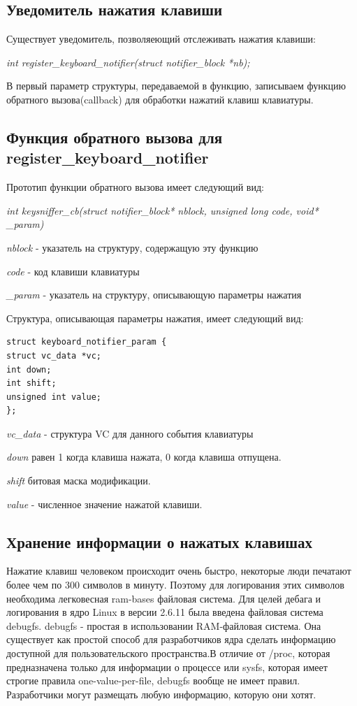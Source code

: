 \subsection{Уведомитель нажатия клавиши}
Существует уведомитель, позволяеющий отслеживать нажатия клавиши:

\textit{int register\_keyboard\_notifier(struct notifier\_block *nb);}

В первый параметр  структуры, передаваемой в функцию,  записываем функцию обратного вызова(callback) для обработки нажатий клавиш клавиатуры.


\subsection{Функция обратного вызова для register\_keyboard\_notifier}
Прототип функции обратного вызова имеет следующий вид:

\textit{int keysniffer\_cb(struct notifier\_block* nblock,
unsigned long code,
void* \_param)
}

\textit{nblock} - указатель на структуру, содержащую эту функцию

\textit{code} - код клавиши клавиатуры

\textit{\_param} - указатель на структуру, описывающую параметры нажатия

Структура, описывающая параметры нажатия, имеет следующий вид:
 \begin{lstlisting}[style=pseudocode,caption={ struct keyboard\_notifier\_param}] 
struct keyboard_notifier_param {
struct vc_data *vc;	
int down;	
int shift;	
unsigned int value;	
};
 \end{lstlisting}
 
\textit{vc\_data} - структура VC для данного события клавиатуры\cite{book2}

 \textit{down} равен 1 когда клавиша нажата, 0 когда клавиша отпущена.

\textit{shift} битовая маска модификации.

\textit{value} - численное значение нажатой клавиши.




\subsection{Хранение информации о нажатых клавишах}
Нажатие клавиш человеком происходит очень быстро, некоторые люди печатают более чем по 300 символов в минуту. Поэтому для логирования этих символов необходима легковесная ram-bases файловая система.  Для целей дебага и логирования в ядро Linux в версии 2.6.11 была введена файловая система debugfs. debugfs - простая в использовании RAM-файловая система. Она существует как простой способ для разработчиков ядра сделать информацию доступной для пользовательского пространства.В отличие от /proc, которая предназначена только для информации о процессе или sysfs, которая имеет строгие правила one-value-per-file, debugfs вообще не имеет правил. Разработчики могут размещать любую информацию, которую они хотят.

